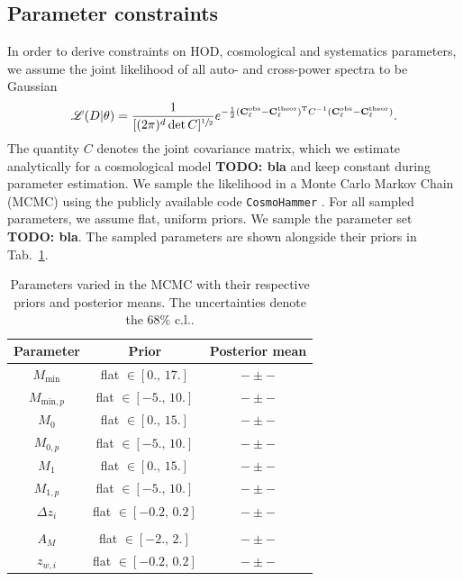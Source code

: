 \documentclass[a4paper,11pt]{article}
\newcommand{\todo}[1]{{\bf TODO: #1}}
\newcommand\Tstrut{\rule{0pt}{3ex}}
\begin{document}
  \subsection{Parameter constraints}\label{ssec:methods.constr}
    In order to derive constraints on HOD, cosmological and systematics parameters, we assume the joint likelihood of all auto- and cross-power spectra to be Gaussian 
    \begin{align}
      \mathscr{L}(D \vert \theta) = \frac{1}{[(2\pi)^{d}\det{C}]^{\sfrac{1}{2}}} e^{-\frac{1}{2}(\mathbf{C}^{\mathrm{obs}}_{\ell}-\mathbf{C}^{\mathrm{theor}}_{\ell})^{\mathrm{T}}C^{-1}(\mathbf{C}^{\mathrm{obs}}_{\ell}-\mathbf{C}^{\mathrm{theor}}_{\ell})}.
      \label{eq:likelihood}
    \end{align}
    The quantity $C$ denotes the joint covariance matrix, which we estimate analytically for a cosmological model \todo{bla} and keep constant during parameter estimation.
    We sample the likelihood in a Monte Carlo Markov Chain (MCMC) using the publicly available code \texttt{CosmoHammer} \cite{Akeret:2013}. For all sampled parameters, we assume flat, uniform priors. We sample the parameter set \todo{bla}. The sampled parameters are shown alongside their priors in Tab.~\ref{tab:params}.

    \begin{table}
      \caption{Parameters varied in the MCMC with their respective priors and posterior means. The uncertainties denote the $68 \%$ c.l..} \label{tab:params}
      \begin{center}
        \begin{tabular}{ccc}
          \hline\hline 
          Parameter & Prior & Posterior mean\\ \hline \Tstrut                             
          $M_{\mathrm{min}}$ & flat $\in [0., \,17.]$ & $- \pm -$ \\ 
          $M_{\mathrm{min}, p}$ & flat $\in [-5., \,10.]$ & $- \pm -$ \\
          $M_{0}$ & flat $\in [0., \,15.]$ & $- \pm -$ \\
          $M_{0, p}$ & flat $\in [-5., \,10.]$ & $- \pm -$ \\
          $M_{1}$ & flat $\in [0., \,15.]$ & $- \pm -$ \\ 
          $M_{1, p}$ & flat $\in [-5., \,10.]$ & $- \pm -$ \\
          $\Delta z_{i}$ & flat $\in [-0.2, \,0.2]$ & $- \pm -$ \\ \\
          $A_{M}$ & flat $\in [-2., \,2.]$ & $- \pm -$ \\
          $z_{w, i}$ & flat $\in [-0.2, \,0.2]$ & $- \pm -$ \\
          \hline\hline 
        \end{tabular}
      \end{center}
    \end{table} 
\end{document}
